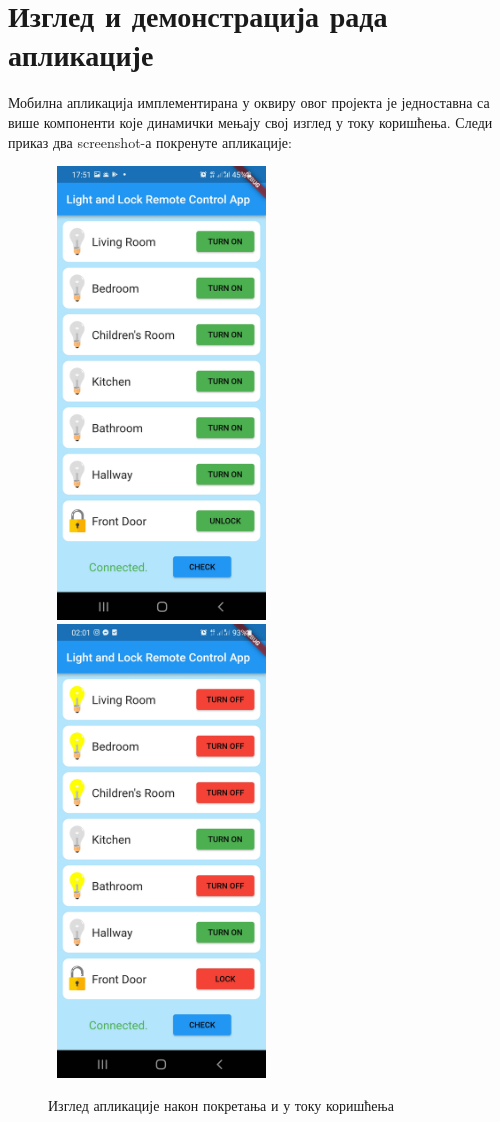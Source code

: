 \documentclass[12pt]{article}
\begin{document}
\section{Изглед и демонстрација рада апликације}
Мобилна апликација имплементирана у оквиру овог пројекта је једноставна са више компоненти које динамички мењају свој изглед у току коришћења. Следи приказ два screenshot-а покренуте апликације:
\begin{figure}[H]
\centering
\includegraphics[height=12cm, width=6cm]{images/app1}
\hfill %
\includegraphics[height=12cm, width=6cm]{images/app2}
\caption{Изглед апликације након покретања и у току коришћења}
\end{figure}
\end{document}
